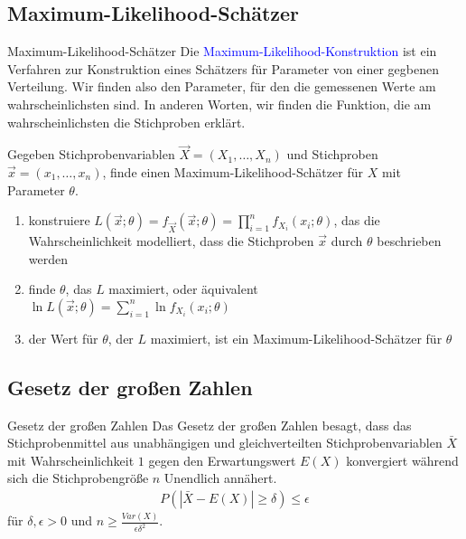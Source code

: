 \documentclass{beamer}
\def\padding{\vspace{0.5cm}}
\def\b{\textcolor{blue}}
\begin{document}
\subsection{Maximum-Likelihood-Schätzer}
\begin{frame}{Maximum-Likelihood-Schätzer}
    Die \b{Maximum-Likelihood-Konstruktion} ist ein Verfahren zur Konstruktion eines Schätzers für Parameter von einer gegbenen Verteilung. Wir finden also den Parameter, für den die gemessenen Werte am wahrscheinlichsten sind. In anderen Worten, wir finden die Funktion, die am wahrscheinlichsten die Stichproben erklärt.\pause\par\padding
    Gegeben Stichprobenvariablen $\overrightarrow{X} = (X_1, \dots, X_n)$ und Stichproben $\overrightarrow{x} = (x_1, \dots, x_n)$, finde einen Maximum-Likelihood-Schätzer für $X$ mit Parameter $\theta$.
    \begin{enumerate}
        \item konstruiere $L(\overrightarrow{x}; \theta) = f_{\overrightarrow{X}}(\overrightarrow{x}; \theta) = \prod_{i=1}^n f_{X_i}(x_i; \theta)$, das die Wahrscheinlichkeit modelliert, dass die Stichproben $\overrightarrow{x}$ durch $\theta$ beschrieben werden
        \item finde $\theta$, das $L$ maximiert, oder äquivalent $\ln L(\overrightarrow{x}; \theta) = \sum_{i=1}^n \ln f_{X_i}(x_i; \theta)$
        \item der Wert für $\theta$, der $L$ maximiert, ist ein Maximum-Likelihood-Schätzer für $\theta$
    \end{enumerate}
\end{frame}

\subsection{Gesetz der großen Zahlen}
\begin{frame}{Gesetz der großen Zahlen}
    Das Gesetz der großen Zahlen besagt, dass das Stichprobenmittel aus unabhängigen und gleichverteilten Stichprobenvariablen $\bar{X}$ mit Wahrscheinlichkeit $1$ gegen den Erwartungswert $E(X)$ konvergiert während sich die Stichprobengröße $n$ Unendlich annähert.\pause
    \begin{align*}
        P(|\bar{X} - E(X)| \geq \delta) \leq \epsilon
    \end{align*}
    für $\delta, \epsilon > 0$ und $n \geq \frac{Var(X)}{\epsilon \delta^2}$.
\end{frame}
\end{document}
